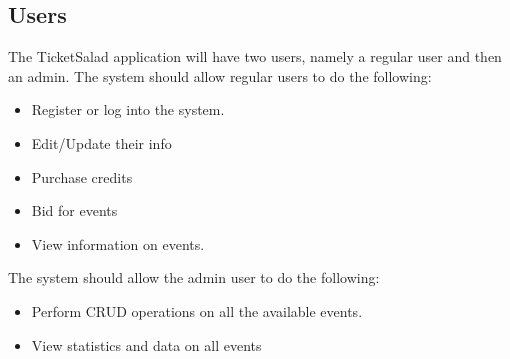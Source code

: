 \documentclass[11pt]{article}
\begin{document}
	\subsection{Users}
	The TicketSalad application will have two users, namely a regular user and then an admin.
	The system should allow regular users to do the following:
	\begin{itemize}
		\item Register or log into the system.
		\item Edit/Update their info
		\item Purchase credits
		\item Bid for events
		\item View information on events.
	\end{itemize} 
	The system should allow the admin user to do the following:
	\begin{itemize}
		\item Perform CRUD operations on all the available events.
		\item View statistics and data on all events
	\end{itemize}
	
\end{document}
